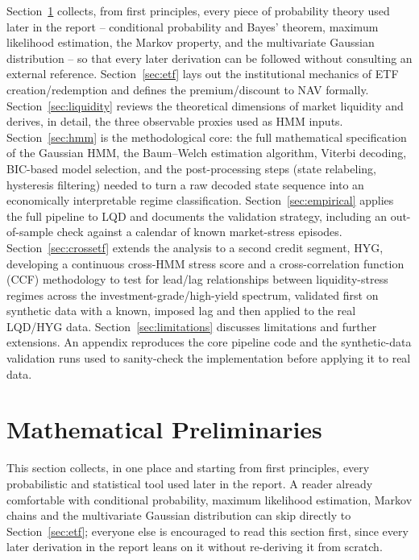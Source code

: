 \documentclass[11pt]{article}
\theoremstyle{definition}
\theoremstyle{remark}
\begin{document}
Section~\ref{sec:prelim} collects, from first principles, every piece of probability theory used later in the report -- conditional probability and Bayes' theorem, maximum likelihood estimation, the Markov property, and the multivariate Gaussian distribution -- so that every later derivation can be followed without consulting an external reference. Section~\ref{sec:etf} lays out the institutional mechanics of ETF creation/redemption and defines the premium/discount to NAV formally. Section~\ref{sec:liquidity} reviews the theoretical dimensions of market liquidity and derives, in detail, the three observable proxies used as HMM inputs. Section~\ref{sec:hmm} is the methodological core: the full mathematical specification of the Gaussian HMM, the Baum--Welch estimation algorithm, Viterbi decoding, BIC-based model selection, and the post-processing steps (state relabeling, hysteresis filtering) needed to turn a raw decoded state sequence into an economically interpretable regime classification. Section~\ref{sec:empirical} applies the full pipeline to LQD and documents the validation strategy, including an out-of-sample check against a calendar of known market-stress episodes. Section~\ref{sec:crossetf} extends the analysis to a second credit segment, HYG, developing a continuous cross-HMM stress score and a cross-correlation function (CCF) methodology to test for lead/lag relationships between liquidity-stress regimes across the investment-grade/high-yield spectrum, validated first on synthetic data with a known, imposed lag and then applied to the real LQD/HYG data. Section~\ref{sec:limitations} discusses limitations and further extensions. An appendix reproduces the core pipeline code and the synthetic-data validation runs used to sanity-check the implementation before applying it to real data.

\section{Mathematical Preliminaries}
\label{sec:prelim}

This section collects, in one place and starting from first principles, every probabilistic and statistical tool used later in the report. A reader already comfortable with conditional probability, maximum likelihood estimation, Markov chains and the multivariate Gaussian distribution can skip directly to Section~\ref{sec:etf}; everyone else is encouraged to read this section first, since every later derivation in the report leans on it without re-deriving it from scratch.
\end{document}
